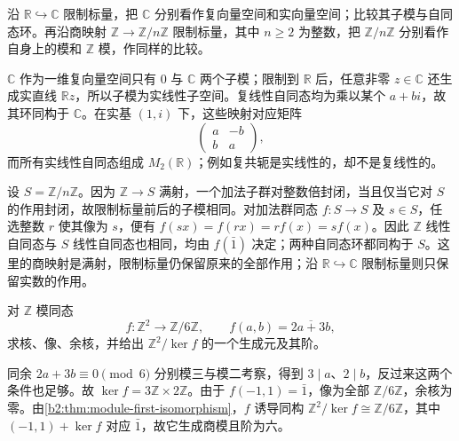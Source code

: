 \begin{exercise}\label{b2:ex:02-restriction-of-scalars}
	沿 \(\mathbb R\hookrightarrow\mathbb C\) 限制标量，把 \(\mathbb C\) 分别看作复向量空间和实向量空间；比较其子模与自同态环。再沿商映射 \(\mathbb Z\to\mathbb Z/n\mathbb Z\) 限制标量，其中 \(n\ge2\) 为整数，把 \(\mathbb Z/n\mathbb Z\) 分别看作自身上的模和 \(\mathbb Z\) 模，作同样的比较。
\end{exercise}
\begin{solution}
	\(\mathbb C\) 作为一维复向量空间只有 \(0\) 与 \(\mathbb C\) 两个子模；限制到 \(\mathbb R\) 后，任意非零 \(z\in\mathbb C\) 还生成实直线 \(\mathbb Rz\)，所以子模为实线性子空间。复线性自同态均为乘以某个 \(a+bi\)，故其环同构于 \(\mathbb C\)。在实基 \((1,i)\) 下，这些映射对应矩阵
	\[
		\begin{pmatrix}a&-b\\b&a\end{pmatrix},
	\]
	而所有实线性自同态组成 \(M_2(\mathbb R)\)；例如复共轭是实线性的，却不是复线性的。

	设 \(S=\mathbb Z/n\mathbb Z\)。因为 \(\mathbb Z\to S\) 满射，一个加法子群对整数倍封闭，当且仅当它对 \(S\) 的作用封闭，故限制标量前后的子模相同。对加法群同态 \(f:S\to S\) 及 \(s\in S\)，任选整数 \(r\) 使其像为 \(s\)，便有 \(f(sx)=f(rx)=r f(x)=sf(x)\)。因此 \(\mathbb Z\) 线性自同态与 \(S\) 线性自同态也相同，均由 \(f(\bar1)\) 决定；两种自同态环都同构于 \(S\)。这里的商映射是满射，限制标量仍保留原来的全部作用；沿 \(\mathbb R\hookrightarrow\mathbb C\) 限制标量则只保留实数的作用。
\end{solution}

\begin{exercise}\label{b2:ex:02-congruence-kernel}
	对 \(\mathbb Z\) 模同态
	\[
		f:\mathbb Z^2\longrightarrow\mathbb Z/6\mathbb Z,\qquad f(a,b)=\overline{2a+3b},
	\]
	求核、像、余核，并给出 \(\mathbb Z^2/\ker f\) 的一个生成元及其阶。
\end{exercise}
\begin{solution}
	同余 \(2a+3b\equiv0\pmod6\) 分别模三与模二考察，得到 \(3\mid a\)、\(2\mid b\)，反过来这两个条件也足够。故 \(\ker f=3\mathbb Z\times2\mathbb Z\)。由于 \(f(-1,1)=\bar1\)，像为全部 \(\mathbb Z/6\mathbb Z\)，余核为零。由\cref{b2:thm:module-first-isomorphism}，\(f\) 诱导同构 \(\mathbb Z^2/\ker f\cong\mathbb Z/6\mathbb Z\)，其中 \((-1,1)+\ker f\) 对应 \(\bar1\)，故它生成商模且阶为六。
\end{solution}

